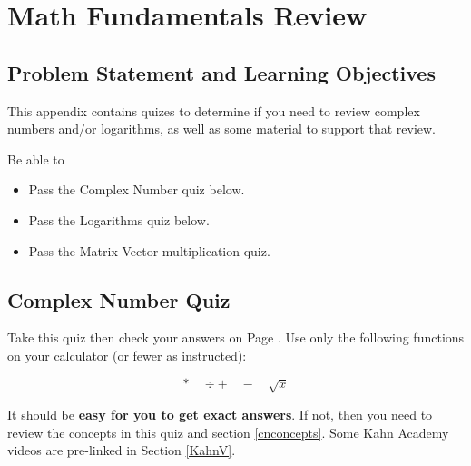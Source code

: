 %
%
%

\chapter{Math Fundamentals Review}

\section{Problem Statement and Learning Objectives}
This appendix contains quizes to determine if you need to review complex numbers and/or logarithms, as well as some material to support that review.

Be able to
\begin{itemize}
    \item Pass the Complex Number quiz below.
    \item Pass the Logarithms quiz below. 
    \item Pass the Matrix-Vector multiplication quiz.
\end{itemize}

\section{Complex Number Quiz}\label{ComplexNumberQuiz}
Take this quiz then check your answers on Page \pageref{CN_answers}.  Use only the following functions on your calculator (or fewer as instructed):

\[
* \quad \div + \quad - \quad \sqrt{x}
\]


It should be {\bf easy for you to get exact answers}.  If not, then you need to review the concepts in this quiz and section \ref{cnconcepts}.   Some Kahn Academy videos are pre-linked in Section \ref{KahnV}.


